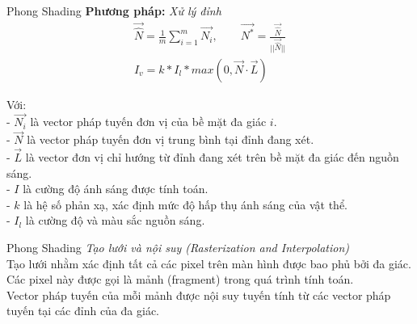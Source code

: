 \documentclass[11pt, aspectratio=169]{beamer}
\begin{document}
\begin{frame}{Phong Shading}
	\textbf{Phương pháp:}
		\textit{Xử lý đỉnh}\\
		\begin{gather*}
			\vec{\hat{N}} = \frac{1}{m} \sum_{i=1}^{m} \vec{N_i}, \quad \quad \vec{N^*} = \frac{\vec{\hat{N}}}{||\vec{\hat{N}}||}\\
			I_v = k * I_l * max(0, \vec{N} \cdot \vec{L})
		\end{gather*}
		
%		
		Với:\\
		- $\vec{N_i}$ là vector pháp tuyến đơn vị của bề mặt đa giác $i$.\\
		- $\vec{N}$ là vector pháp tuyến đơn vị trung bình tại đỉnh đang xét.\\
		- $\vec{L}$ là vector đơn vị chỉ hướng từ đỉnh đang xét trên bề mặt đa giác đến nguồn sáng.\\
		- $I$ là cường độ ánh sáng được tính toán.\\
		- $k$ là hệ số phản xạ, xác định mức độ hấp thụ ánh sáng của vật thể.\\
		- $I_l$ là cường độ và màu sắc nguồn sáng.
\end{frame}
%
\begin{frame}{Phong Shading}
	\textit{Tạo lưới và nội suy (Rasterization and Interpolation)}\\
	Tạo lưới nhằm xác định tất cả các pixel trên màn hình được bao phủ bởi đa giác. Các pixel này được gọi là mảnh (fragment) trong quá trình tính toán.\\
	Vector pháp tuyến của mỗi mảnh được nội suy tuyến tính từ các vector pháp tuyến tại các đỉnh của đa giác.
\end{frame}
%
\end{document}
